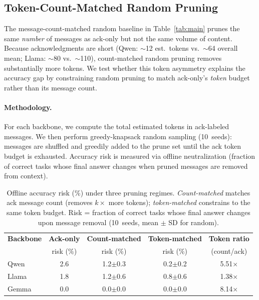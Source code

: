 \subsection{Token-Count-Matched Random Pruning}
\label{app:token_matched}

The message-count-matched random baseline in Table~\ref{tab:main} prunes the same
\emph{number} of messages as ack-only but not the same volume of content.
Because acknowledgments are short (Qwen: $\sim$12 est.\ tokens vs.\ $\sim$64 overall mean;
Llama: $\sim$80 vs.\ $\sim$110), count-matched random pruning removes substantially more
tokens. We test whether this token asymmetry explains the accuracy gap by constraining
random pruning to match ack-only's \emph{token} budget rather than its message count.

\paragraph{Methodology.} For each backbone, we compute the total estimated tokens
in ack-labeled messages. We then perform greedy-knapsack random sampling (10~seeds):
messages are shuffled and greedily added to the prune set until the ack token budget
is exhausted. Accuracy risk is measured via offline neutralization (fraction of correct
tasks whose final answer changes when pruned messages are removed from context).

\begin{table}[h]
\centering
\caption{Offline accuracy risk (\%) under three pruning regimes.
\emph{Count-matched} matches ack message count (removes $k{\times}$ more tokens);
\emph{token-matched} constrains to the same token budget.
Risk = fraction of correct tasks whose final answer changes upon message removal
(10~seeds, mean $\pm$ SD for random).}
\label{app:tab:token_matched}
\small
\begin{tabular}{lcccc}
\toprule
\textbf{Backbone} & \textbf{Ack-only} & \textbf{Count-matched} & \textbf{Token-matched} & \textbf{Token ratio} \\
 & risk (\%) & risk (\%) & risk (\%) & (count/ack) \\
\midrule
Qwen & 2.6 & 1.2$\pm$0.3 & 0.2$\pm$0.2 & 5.51$\times$ \\
Llama & 1.8 & 1.2$\pm$0.6 & 0.8$\pm$0.6 & 1.38$\times$ \\
Gemma & 0.0 & 0.0$\pm$0.0 & 0.0$\pm$0.0 & 8.14$\times$ \\
\bottomrule
\end{tabular}
\end{table}

